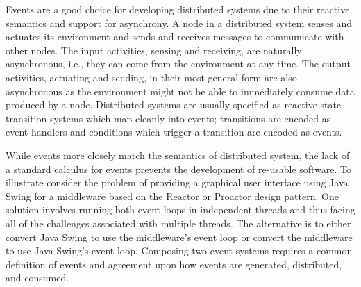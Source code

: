 Events are a good choice for developing distributed systems due to their reactive semantics and support for asynchrony.
A node in a distributed system senses and actuates its environment and sends and receives messages to communicate with other nodes.
The input activities, sensing and receiving, are naturally asynchronous, i.e., they can come from the environment at any time.
The output activities, actuating and sending, in their most general form are also asynchronous as the environment might not be able to immediately consume data produced by a node.
Distributed systems are usually specified as reactive state transition systems which map cleanly into events; transitions are encoded as event handlers and conditions which trigger a transition are encoded as events.

While events more closely match the semantics of distributed system, the lack of a standard calculus for events prevents the development of re-usable software.
To illustrate consider the problem of providing a graphical user interface using Java Swing for a middleware based on the Reactor or Proactor design pattern.
One solution involves running both event loops in independent threads and thus facing all of the challenges associated with multiple threads.
The alternative is to either convert Java Swing to use the middleware's event loop or convert the middleware to use Java Swing's event loop.
Composing two event systems requires a common definition of events and agreement upon how events are generated, distributed, and consumed.


